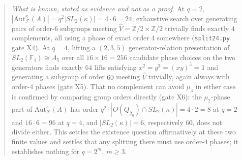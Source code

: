 \begin{quote}
\emph{What is known, stated as evidence and not as a proof.} At $q=2$,
$|\mathrm{Aut}_{\mathcal{F}}^\kappa(A)|=q^2|SL_2(\kappa)|=4\cdot 6=24$;
exhaustive search over generating pairs of order-$6$ subgroups meeting
$\hat V=\mathbb{Z}/2\times\mathbb{Z}/2$ trivially finds exactly $4$
complements, all using a phase of exact order $4$ somewhere
(\texttt{split24.py} gate X4). At $q=4$, lifting a $(2,3,5)$
generator-relation presentation of $SL_2(\mathbb{F}_4)\cong A_5$ over all
$16\times 16=256$ candidate phase choices on the two generators finds
exactly $64$ lifts satisfying $x^2=y^3=(xy)^5=1$ and generating a subgroup
of order $60$ meeting $\hat V$ trivially, again always with order-$4$ phases
(gate X5). That no complement can avoid $\mu_4$ in either case is confirmed
by comparing group orders directly (gate X6): the $\mu_2$-phase part of
$\mathrm{Aut}_{\mathcal{F}}^\kappa(A)$ has order $q^2\cdot|O(Q_{\beta_0})\cap SL_2(\kappa)|=4\cdot2=8$
at $q=2$ and $16\cdot 6=96$ at $q=4$, and $|SL_2(\kappa)|=6$, respectively
$60$, does not divide either. This settles the existence question
affirmatively at these two finite values and settles that any splitting
there must use order-$4$ phases; it establishes nothing for $q=2^m$,
$m\geq 3$.
\end{quote}
